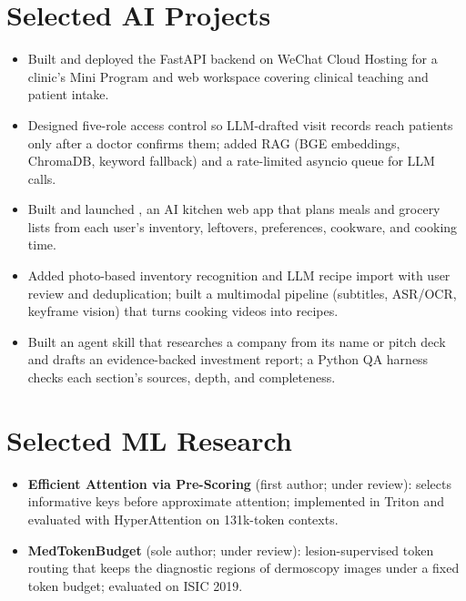 \documentclass[10pt]{article}
\begin{document}
\section{Selected AI Projects}
\begin{itemize}
\item Built and deployed the FastAPI backend on WeChat Cloud Hosting for a clinic's Mini Program and web workspace covering clinical teaching and patient intake.
\item Designed five-role access control so LLM-drafted visit records reach patients only after a doctor confirms them; added RAG (BGE embeddings, ChromaDB, keyword fallback) and a rate-limited asyncio queue for LLM calls.
\end{itemize}
\begin{itemize}
\item Built and launched , an AI kitchen web app that plans meals and grocery lists from each user's inventory, leftovers, preferences, cookware, and cooking time.
\item Added photo-based inventory recognition and LLM recipe import with user review and deduplication; built a multimodal pipeline (subtitles, ASR/OCR, keyframe vision) that turns cooking videos into recipes.
\end{itemize}
\begin{itemize}
\item Built an agent skill that researches a company from its name or pitch deck and drafts an evidence-backed investment report; a Python QA harness checks each section's sources, depth, and completeness.
\end{itemize}

\section{Selected ML Research}
\begin{itemize}
\item \textbf{Efficient Attention via Pre-Scoring} (first author; under review): selects informative keys before approximate attention; implemented in Triton and evaluated with HyperAttention on 131k-token contexts. 
\item \textbf{MedTokenBudget} (sole author; under review): lesion-supervised token routing that keeps the diagnostic regions of dermoscopy images under a fixed token budget; evaluated on ISIC 2019.
\end{itemize}
\end{document}

